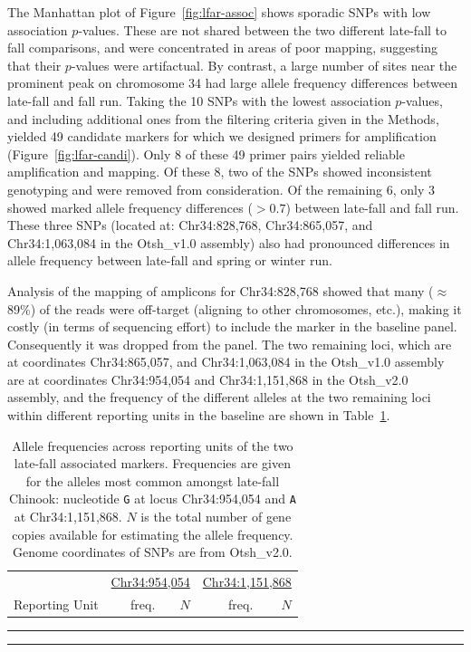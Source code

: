 The Manhattan plot of Figure~\ref{fig:lfar-assoc} shows sporadic SNPs with low association
$p$-values.  These are not shared between the two different late-fall to fall comparisons, and
were concentrated in areas of poor mapping, suggesting that their
$p$-values were artifactual.  By contrast, a large number of sites near the prominent peak on
chromosome 34 had large allele frequency differences between late-fall and fall run.  Taking the
10 SNPs with the lowest association $p$-values, and including additional ones from the filtering criteria given in the
Methods, yielded 49 candidate markers for which we designed primers for amplification (Figure~\ref{fig:lfar-candi}).  Only 8
of these 49 primer pairs yielded reliable amplification and mapping.   Of these 8, two of the SNPs
showed inconsistent genotyping and were removed from consideration.  Of the remaining 6, only 3
showed marked allele frequency differences ($> 0.7$) between late-fall and fall run.  These three
SNPs (located at: Chr34:828,768,  Chr34:865,057, and Chr34:1,063,084 in the Otsh\_v1.0 assembly)
also had pronounced differences in allele frequency between
late-fall and spring or winter run.

Analysis of the mapping of amplicons for Chr34:828,768
showed that many ($\approx$89\%) of the reads were off-target (aligning to other chromosomes,
etc.), making it costly (in terms of sequencing effort) to include the marker in the baseline panel.
Consequently it was dropped from the panel.  The two remaining loci, which are at coordinates
Chr34:865,057, and Chr34:1,063,084 in the Otsh\_v1.0 assembly are at coordinates
Chr34:954,054 and  Chr34:1,151,868 in the Otsh\_v2.0 assembly, and
the frequency of the different alleles at the two remaining loci
within different reporting units in the baseline are shown in Table~\ref{tab:lfar-freqs}.
\begin{table}
\caption{\footnotesize Allele frequencies across reporting units of the two late-fall associated
markers.  Frequencies are given for the alleles most common amongst late-fall Chinook: nucleotide
{\tt G} at locus Chr34:954,054 and {\tt A} at Chr34:1,151,868.  $N$ is the total number of gene
copies available for estimating the allele frequency. Genome coordinates of SNPs are from Otsh\_v2.0.}
\label{tab:lfar-freqs}
{\footnotesize
\begin{tabular*}{0.48\textwidth}{@{\extracolsep{\fill}} lrrrr}
\hline\hline
& \multicolumn{2}{c}{\underline{Chr34:954,054}} & \multicolumn{2}{c}{\underline{Chr34:1,151,868}} \\
Reporting Unit & freq. & $N$ & freq. & $N$ \\ \hline

\end{tabular*}
}
\vspace*{-2.3ex}\hrule width0.48\textwidth
\vspace*{0.3ex}\hrule width0.48\textwidth
\end{table}

